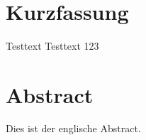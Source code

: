 ~\vfill
\section*{Kurzfassung}

Testtext Testtext 123

\section*{Abstract}


Dies ist der englische Abstract.

\vfill~